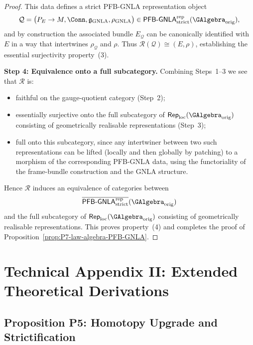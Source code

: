 \documentclass[11pt]{book}
\theoremstyle{plain}
\theoremstyle{definition}
\begin{document}
\begin{proof}
This data defines a strict PFB-GNLA representation object
\[
  \mathcal{Q}
  =
  \bigl(P_E\to M,\Conn,\mathfrak{g}_{\mathrm{GNLA}},
        \rho_{\mathrm{GNLA}}\bigr)
  \in
  \mathsf{PFB\text- GNLA}^{\mathrm{rep}}_{\mathrm{strict}}
  (\GAlgebra_{\mathrm{orig}}),
\]
and by construction the associated bundle \(E_{\mathcal{Q}}\) can be
canonically identified with \(E\) in a way that intertwines
\(\rho_{\mathcal{Q}}\) and \(\rho\).  Thus
\(\mathcal{R}(\mathcal{Q})\cong(E,\rho)\), establishing the essential
surjectivity property~\textnormal{(3)}.



\medskip\noindent
\textbf{Step 4: Equivalence onto a full subcategory.}
Combining Steps~1–3 we see that \(\mathcal{R}\) is:

\begin{itemize}
  \item faithful on the gauge-quotient category (Step~2);
  \item essentially surjective onto the full subcategory of
        \(\mathsf{Rep}_{\mathrm{loc}}(\GAlgebra_{\mathrm{orig}})\)
        consisting of geometrically realisable representations
        (Step~3);
  \item full onto this subcategory, since any intertwiner between
        two such representations can be lifted (locally and then
        globally by patching) to a morphism of the corresponding
        PFB-GNLA data, using the functoriality of the frame-bundle
        construction and the GNLA structure.
\end{itemize}

Hence \(\mathcal{R}\) induces an equivalence of categories between
\[
  \overline{\mathsf{PFB\text- GNLA}^{\mathrm{rep}}_{\mathrm{strict}}}
    (\GAlgebra_{\mathrm{orig}})
\]
and the full subcategory of
\(\mathsf{Rep}_{\mathrm{loc}}(\GAlgebra_{\mathrm{orig}})\) consisting
of geometrically realisable representations.  This proves
property~\textnormal{(4)} and completes the proof of
Proposition~\ref{prop:P7-law-algebra-PFB-GNLA}.



\end{proof}



\chapter{Technical Appendix II: Extended Theoretical Derivations}


\section{Proposition P5: Homotopy Upgrade and Strictification}
\label{app:II-P5}
\end{document}
